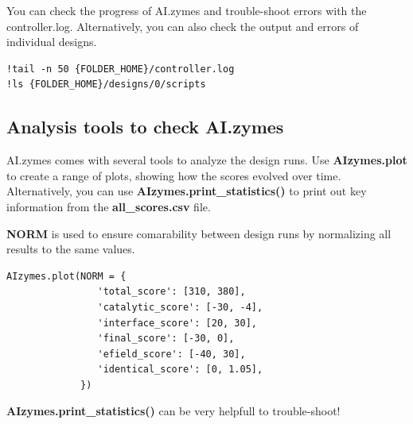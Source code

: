 \documentclass[10pt]{extarticle}
\begin{document}
\begin{tcolorbox}[colback=mpgAccentCyan!20!white,colframe=mpgAccentCyan!80!black,title=Tip]
You can check the progress of AI.zymes and trouble-shoot errors with the controller.log.
Alternatively, you can also check the output and errors of individual designs.
\end{tcolorbox}

\vspace*{0.5\baselineskip}
\begin{lstlisting}[basicstyle=\color{black}\fontsize{9}{11}\selectfont\ttfamily, frame=single, rulecolor=\color{black}, breaklines=true]
!tail -n 50 {FOLDER_HOME}/controller.log
!ls {FOLDER_HOME}/designs/0/scripts
\end{lstlisting}
\vspace*{0.5\baselineskip}

\subsection{Analysis tools to check AI.zymes}

AI.zymes comes with several tools to analyze the design runs. Use \textbf{AIzymes.plot} to create a range of plots, showing how the scores evolved over time.
Alternatively, you can use \textbf{AIzymes.print\_statistics()} to print out key information from the \textbf{all\_scores.csv} file.


\begin{tcolorbox}[colback=mpgAccentBlue!20!white,colframe=mpgAccentBlue!80!black,title=Note]
\textbf{NORM} is used to ensure comarability between design runs by normalizing all results to the same values.
\end{tcolorbox}

\vspace*{0.5\baselineskip}
\begin{lstlisting}[basicstyle=\color{black}\fontsize{9}{11}\selectfont\ttfamily, frame=single, rulecolor=\color{black}, breaklines=true]
AIzymes.plot(NORM = {
                'total_score': [310, 380], 
                'catalytic_score': [-30, -4],
                'interface_score': [20, 30],
                'final_score': [-30, 0],
                'efield_score': [-40, 30],
                'identical_score': [0, 1.05],
             })                   
\end{lstlisting}
\vspace*{0.5\baselineskip}

\begin{tcolorbox}[colback=mpgAccentCyan!20!white,colframe=mpgAccentCyan!80!black,title=Tip]
\textbf{AIzymes.print\_statistics()} can be very helpfull to trouble-shoot!
\end{tcolorbox}
\end{document}
